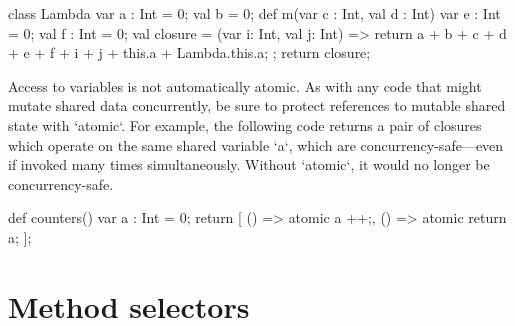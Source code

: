 \begin{xten}
class Lambda {
   var a : Int = 0;
   val b = 0;
   def m(var c : Int, val d : Int) {
      var e : Int = 0;
      val f : Int = 0;
      val closure = (var i: Int, val j: Int) => {
    	  return a + b + c + d + e + f + i + j + this.a + Lambda.this.a;
      };
      return closure;
   }
}
\end{xten}
%



Access to variables is not automatically atomic.  As
with any code that might mutate shared data concurrently, be sure to protect
references to mutable shared state with \xcd`atomic`. For example, the
following code returns a pair of closures which operate on the same shared
variable \xcd`a`, which are concurrency-safe---even if invoked many times
simultaneously. Without \xcd`atomic`, it would no longer be concurrency-safe.


\begin{xten}
  def counters() {
      var a : Int = 0;
       return [
          () => {atomic a ++;},
          () => {atomic return a;}
          ];
   }
\end{xten}
%




\section{Method selectors}
\label{MethodSelectors}

